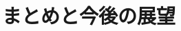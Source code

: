 \documentclass[paper]{ieicej}
\begin{document}
\section{まとめと今後の展望}

\ack %

%
%
\begin{thebibliography}{99}%
\bibitem{}
\end{thebibliography}

\appendix
\section{}

\begin{biography}
\end{biography}
\end{document}
